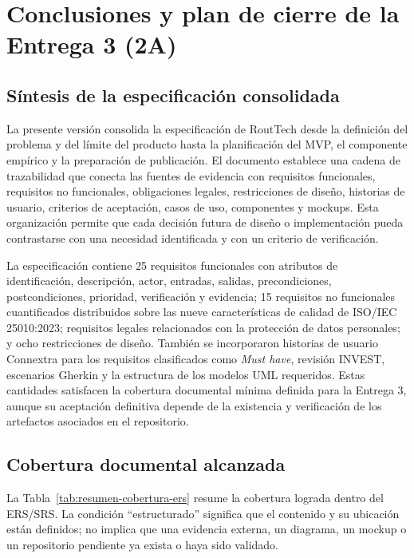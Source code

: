 \documentclass[12pt,a4paper]{article}
\begin{document}
\section{Conclusiones y plan de cierre de la Entrega 3 (2A)}

\subsection{Síntesis de la especificación consolidada}

La presente versión consolida la especificación de RoutTech desde la definición del problema y del límite del producto hasta la planificación del MVP, el componente empírico y la preparación de publicación. El documento establece una cadena de trazabilidad que conecta las fuentes de evidencia con requisitos funcionales, requisitos no funcionales, obligaciones legales, restricciones de diseño, historias de usuario, criterios de aceptación, casos de uso, componentes y mockups. Esta organización permite que cada decisión futura de diseño o implementación pueda contrastarse con una necesidad identificada y con un criterio de verificación.

La especificación contiene 25 requisitos funcionales con atributos de identificación, descripción, actor, entradas, salidas, precondiciones, postcondiciones, prioridad, verificación y evidencia; 15 requisitos no funcionales cuantificados distribuidos sobre las nueve características de calidad de ISO/IEC 25010:2023; requisitos legales relacionados con la protección de datos personales; y ocho restricciones de diseño. También se incorporaron historias de usuario Connextra para los requisitos clasificados como \textit{Must have}, revisión INVEST, escenarios Gherkin y la estructura de los modelos UML requeridos. Estas cantidades satisfacen la cobertura documental mínima definida para la Entrega 3, aunque su aceptación definitiva depende de la existencia y verificación de los artefactos asociados en el repositorio.

\subsection{Cobertura documental alcanzada}

La Tabla~\ref{tab:resumen-cobertura-ers} resume la cobertura lograda dentro del ERS/SRS. La condición ``estructurado'' significa que el contenido y su ubicación están definidos; no implica que una evidencia externa, un diagrama, un mockup o un repositorio pendiente ya exista o haya sido validado.
\end{document}
